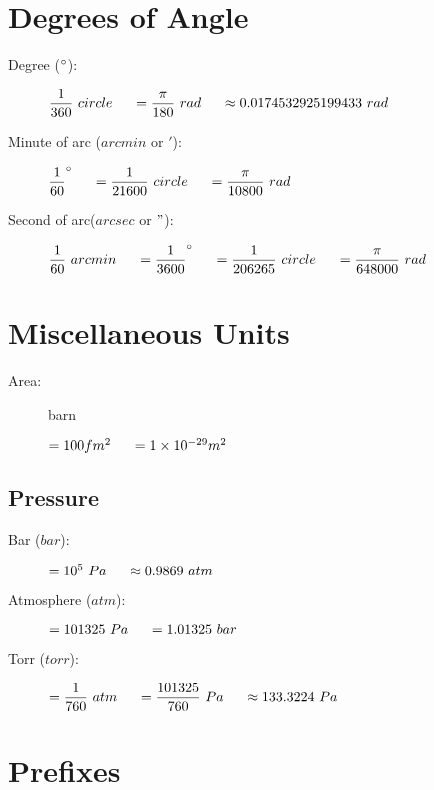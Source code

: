 			
\section{Degrees of Angle}
\begin{description}

\item[Degree ($\degrees$):] \( \dfrac{1}{360}\ circle \tab[0.5cm]= \dfrac{\pi}{180}\ rad \tab[0.5cm] \approx 0.0174532925199433\ rad \)

\item[Minute of arc ($arcmin$ or $'$):] \( \dfrac{1}{60}\degrees \tab[0.5cm] =\dfrac{1}{21600}\ circle \tab[0.5cm] =\dfrac{\pi}{10800}\ rad \)

\item[Second of arc($arcsec$ or $"$):] $\dfrac{1}{60}\ arcmin \tab[0.5cm]=\dfrac{1}{3600} \degrees\tab[0.5cm]=\dfrac{1}{206265}\ circle \tab[0.5cm]=\dfrac{\pi}{648000}\  rad$
\end{description}
            
\section{Miscellaneous Units}

\begin{description}
\item[Area:] barn
\begin{itemize}
\items $= 100 fm^2 \tab[0.5cm] = 1\times 10^{-29}m^2$
\end{itemize}
\end{description}

\subsection{Pressure}
\begin{description}

\item[Bar ($bar$):] $ =10^5\ Pa \tab[0.5cm] \approx 0.9869\ atm $

\item[Atmosphere ($atm$):] $ =101325\ Pa \tab[0.5cm] = 1.01325\ bar $

\item[Torr ($torr$):] $ = \dfrac{1}{760}\ atm \tab[0.5cm]= \dfrac{101325}{760}\ Pa \tab[0.5cm]\approx 133.3224\ Pa $
\end{description}
			
\section{Prefixes}

